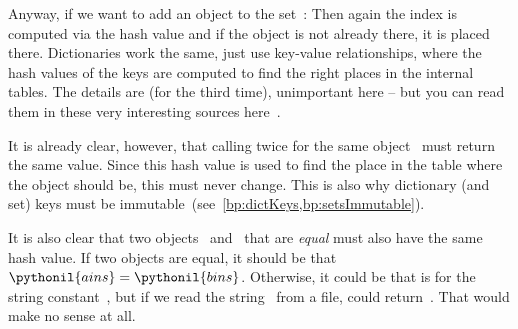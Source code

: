 Anyway, if we want to add an object to the set~:
Then again the index is computed via the hash value and if the object is not already there, it is placed there.
Dictionaries work the same, just use key-value relationships, where the hash values of the keys are computed to find the right places in the internal tables.
The details are (for the third time), unimportant here -- but you can read them in these very interesting sources here~\cite{G2020PHTUTH,L2011PDI}.

It is already clear, however, that calling  twice for the same object~ must return the same value.
Since this hash value is used to find the place in the table where the object should be, this must never change.
This is also why dictionary (and set) keys must be immutable~(see~\cref{bp:dictKeys,bp:setsImmutable}).

It is also clear that two objects~ and~ that are \emph{equal} must also have the same hash value.
If two objects are equal, it should be that $\pythonil{a in s}=\pythonil{b in s}$.
Otherwise, it could be that  is  for the string constant~, but if we read the string~ from a file,  could return~.
That would make no sense at all.

